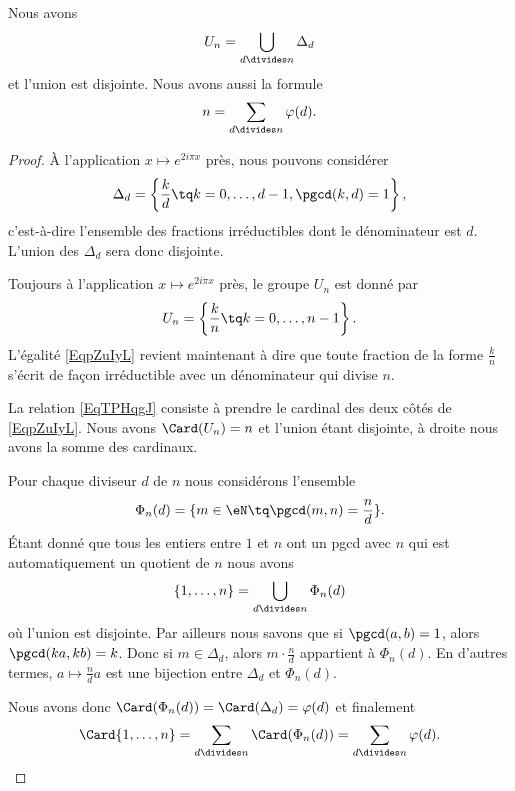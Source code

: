 \begin{lemma}       \label{LemKcpjee}
	Nous avons
	\begin{equation}        \label{EqpZuIyL}
		U_n=\bigcup_{d\divides n}\Delta_d
	\end{equation}
	et l'union est disjointe. Nous avons aussi la formule
	\begin{equation}        \label{EqTPHqgJ}
		n=\sum_{d\divides n}\varphi(d).
	\end{equation}
\end{lemma}

\begin{proof}
	À l'application \( x\mapsto  e^{2i\pi x}\) près, nous pouvons considérer
	\begin{equation}
		\Delta_d=\left\{ \frac{ k }{ d }\tq k=0,\ldots, d-1, \pgcd(k,d)=1 \right\},
	\end{equation}
	c'est-à-dire l'ensemble des fractions irréductibles dont le dénominateur est \( d\). L'union des \( \Delta_d\) sera donc disjointe.

	Toujours à l'application \( x\mapsto  e^{2i\pi x}\) près, le groupe \( U_n\) est donné par
	\begin{equation}
		U_n=\left\{ \frac{ k }{ n }\tq k=0,\ldots, n-1 \right\}.
	\end{equation}
	L'égalité \eqref{EqpZuIyL} revient maintenant à dire que toute fraction de la forme \( \frac{ k }{ n }\) s'écrit de façon irréductible avec un dénominateur qui divise \( n\).

	La relation \eqref{EqTPHqgJ} consiste à prendre le cardinal des deux côtés de \eqref{EqpZuIyL}. Nous avons \( \Card(U_n)=n\) et l'union étant disjointe, à droite nous avons la somme des cardinaux.


	Pour chaque diviseur \( d\) de \( n\) nous considérons l'ensemble
	\begin{equation}
		\Phi_n(d)=\{ m\in \eN\tq \pgcd(m,n)=\frac{ n }{ d } \}.
	\end{equation}
	Étant donné que tous les entiers entre \( 1\) et \( n\) ont un pgcd avec \( n\) qui est automatiquement un quotient de \( n\) nous avons
	\begin{equation}
		\{ 1,\ldots, n \}=\bigcup_{d\divides n}\Phi_n(d)
	\end{equation}
	où l'union est disjointe. Par ailleurs nous savons que si \( \pgcd(a,b)=1\), alors \( \pgcd(ka,kb)=k\). Donc si \( m\in \Delta_d\), alors \( m\cdot \frac{ n }{ d }\) appartient à \( \Phi_n(d)\). En d'autres termes, \( a\mapsto \frac{ n }{ d }a\) est une bijection entre \( \Delta_d\) et \( \Phi_n(d)\).

	Nous avons donc \( \Card(\Phi_n(d))=\Card(\Delta_d)=\varphi(d)\) et finalement
	\begin{equation}
		\Card\{ 1,\ldots, n \}=\sum_{d\divides n}\Card(\Phi_n(d))=\sum_{d\divides n}\varphi(d).
	\end{equation}
\end{proof}

